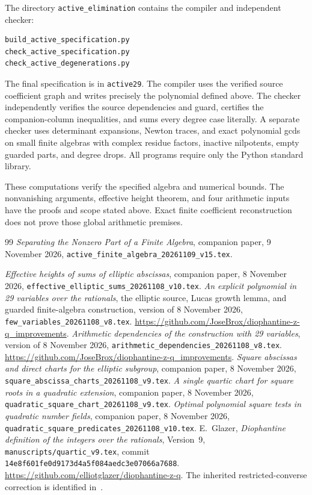 \documentclass[11pt,a4paper]{article}
\begin{document}
\begin{samepage}
The directory \texttt{active\_elimination} contains the compiler and
independent checker:
\begin{verbatim}
build_active_specification.py
check_active_specification.py
check_active_degenerations.py
\end{verbatim}
\end{samepage}
The final specification is in \texttt{active29}. The compiler uses the verified source
coefficient graph and writes precisely the polynomial defined above.
The checker independently verifies the source dependencies and guard,
certifies the companion-column inequalities, and sums every degree case
literally. A separate checker uses determinant expansions, Newton traces,
and exact polynomial gcds on small finite algebras with complex residue
factors, inactive nilpotents, empty guarded parts, and degree drops.
All programs require only the Python standard library.

These computations verify the specified algebra and numerical bounds.
The nonvanishing arguments, effective height theorem, and four
arithmetic inputs have the proofs and scope stated above. Exact finite
coefficient reconstruction does not prove those global arithmetic
premises.

\begin{thebibliography}{99}
\emph{Separating the Nonzero Part of a Finite Algebra},
companion paper, 9 November 2026,
\nolinkurl{active_finite_algebra_20261109_v15.tex}.

\emph{Effective heights of sums of elliptic abscissas},
companion paper, 8 November 2026,
\nolinkurl{effective_elliptic_sums_20261108_v10.tex}.
\emph{An explicit polynomial in 29 variables over the rationals},
the elliptic source, Lucas growth lemma, and guarded finite-algebra
construction, version of 8 November 2026,
\nolinkurl{few_variables_20261108_v8.tex}.
\url{https://github.com/JoseBrox/diophantine-z-q_improvements}.
\emph{Arithmetic dependencies of the construction with 29 variables},
version of 8 November 2026,
\nolinkurl{arithmetic_dependencies_20261108_v8.tex}.
\url{https://github.com/JoseBrox/diophantine-z-q_improvements}.
\emph{Square abscissas and direct charts for the elliptic subgroup},
companion paper, 8 November 2026,
\nolinkurl{square_abscissa_charts_20261108_v9.tex}.
\emph{A single quartic chart for square roots in a quadratic extension},
companion paper, 8 November 2026,
\nolinkurl{quadratic_square_chart_20261108_v9.tex}.
\emph{Optimal polynomial square tests in quadratic number fields},
companion paper, 8 November 2026,
\nolinkurl{quadratic_square_predicates_20261108_v10.tex}.
E.~Glazer, \emph{Diophantine definition of the integers over the
rationals}, Version~9, \nolinkurl{manuscripts/quartic_v9.tex},
commit \nolinkurl{14e8f601fe0d9173d4a5f084aedc3e07066a7688}.
\url{https://github.com/elliotglazer/diophantine-z-q}.
The inherited restricted-converse correction is identified
in~\cite{Dependencies}.
\end{thebibliography}
\end{document}
